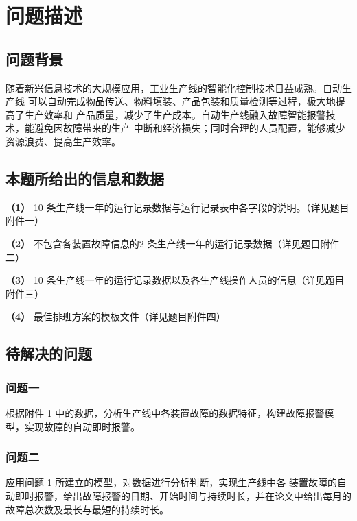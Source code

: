 \documentclass[withoutpreface,bwprint]{cumcmthesis}
\begin{document}
\begin{center}
    \tableofcontents  %
\end{center}

\newpage

\section{问题描述}

\subsection{问题背景}

随着新兴信息技术的大规模应用，工业生产线的智能化控制技术日益成熟。自动生产线 
可以自动完成物品传送、物料填装、产品包装和质量检测等过程，极大地提高了生产效率和 
产品质量，减少了生产成本。自动生产线融入故障智能报警技术，能避免因故障带来的生产 
中断和经济损失；同时合理的人员配置，能够减少资源浪费、提高生产效率。

\subsection{本题所给出的信息和数据}

\textbf{（1）} 10 条生产线一年的运行记录数据与运行记录表中各字段的说明。（详见题目附件一）

\textbf{（2）} 不包含各装置故障信息的2 条生产线一年的运行记录数据（详见题目附件二）

\textbf{（3）} 10 条生产线一年的运行记录数据以及各生产线操作人员的信息（详见题目附件三）

\textbf{（4）} 最佳排班方案的模板文件（详见题目附件四）

\subsection{待解决的问题}

\subsubsection{问题一} 根据附件 1 中的数据，分析生产线中各装置故障的数据特征，构建故障报警模 
型，实现故障的自动即时报警。 

\subsubsection{问题二} 应用问题 1 所建立的模型，对数据进行分析判断，实现生产线中各 装置故障的自动即时报警，给出故障报警的日期、开始时间与持续时长，并在论文中给出每月的故障总次数及最长与最短的持续时长。
\end{document}
